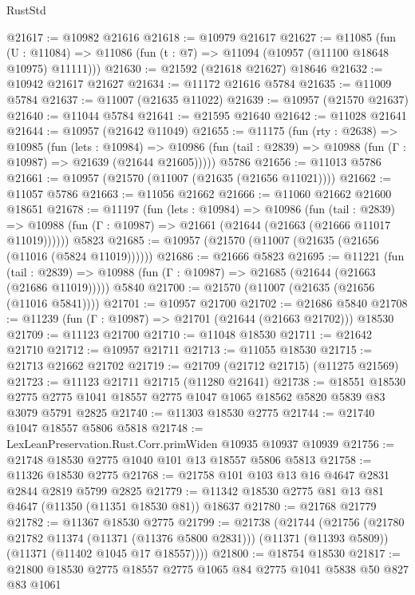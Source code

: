 \begin{lexlean}{RustStd}
\begin{coremodule}
@21617 := @10982 @21616
@21618 := @10979 @21617
@21627 := @11085
    (fun (U : @11084) => @11086 (fun (t : @7) => @11094 (@10957 (@11100 @18648 @10975) @11111)))
@21630 := @21592 (@21618 @21627) @18646
@21632 := @10942 @21617 @21627
@21634 := @11172 @21616 @5784
@21635 := @11009 @5784
@21637 := @11007 (@21635 @11022)
@21639 := @10957 (@21570 @21637)
@21640 := @11044 @5784
@21641 := @21595 @21640
@21642 := @11028 @21641
@21644 := @10957 (@21642 @11049)
@21655 := @11175
    (fun (rty : @2638) =>
    @10985
      (fun (lets : @10984) =>
      @10986 (fun (tail : @2839) => @10988 (fun (Γ : @10987) => @21639 (@21644 @21605)))))
    @5786
@21656 := @11013 @5786
@21661 := @10957 (@21570 (@11007 (@21635 (@21656 @11021))))
@21662 := @11057 @5786
@21663 := @11056 @21662
@21666 := @11060 @21662 @21600 @18651
@21678 := @11197
    (fun (lets : @10984) =>
    @10986
      (fun (tail : @2839) =>
      @10988 (fun (Γ : @10987) => @21661 (@21644 (@21663 (@21666 @11017 @11019))))))
    @5823
@21685 := @10957 (@21570 (@11007 (@21635 (@21656 (@11016 (@5824 @11019))))))
@21686 := @21666 @5823
@21695 := @11221
    (fun (tail : @2839) => @10988 (fun (Γ : @10987) => @21685 (@21644 (@21663 (@21686 @11019)))))
    @5840
@21700 := @21570 (@11007 (@21635 (@21656 (@11016 @5841))))
@21701 := @10957 @21700
@21702 := @21686 @5840
@21708 := @11239 (fun (Γ : @10987) => @21701 (@21644 (@21663 @21702))) @18530
@21709 := @11123 @21700
@21710 := @11048 @18530
@21711 := @21642 @21710
@21712 := @10957 @21711
@21713 := @11055 @18530
@21715 := @21713 @21662 @21702
@21719 := @21709 (@21712 @21715) (@11275 @21569)
@21723 := @11123 @21711 @21715 (@11280 @21641)
@21738 := @18551
    @18530
    @2775
    @2775
    @1041
    @18557
    @2775
    @1047
    @1065
    @18562
    @5820
    @5839
    @83
    @3079
    @5791
    @2825
@21740 := @11303 @18530 @2775
@21744 := @21740 @1047 @18557 @5806 @5818
@21748 := LexLeanPreservation.Rust.Corr.primWiden @10935 @10937 @10939
@21756 := @21748 @18530 @2775 @1040 @101 @13 @18557 @5806 @5813
@21758 := @11326 @18530 @2775
@21768 := @21758 @101 @103 @13 @16 @4647 @2831 @2844 @2819 @5799 @2825
@21779 := @11342 @18530 @2775 @81 @13 @81 @4647 (@11350 (@11351 @18530 @81)) @18637
@21780 := @21768 @21779
@21782 := @11367 @18530 @2775
@21799 := @21738
    (@21744
      (@21756
        (@21780 @21782 @11374 (@11371 (@11376 @5800 @2831)))
        (@11371 (@11393 @5809))
        (@11371 (@11402 @1045 @17 @18557))))
@21800 := @18754 @18530
@21817 := @21800
    @18530
    @2775
    @18557
    @2775
    @1065
    @84
    @2775
    @1041
    @5838
    @50
    @827
    @83
    @1061

\end{coremodule}
\end{lexlean}
